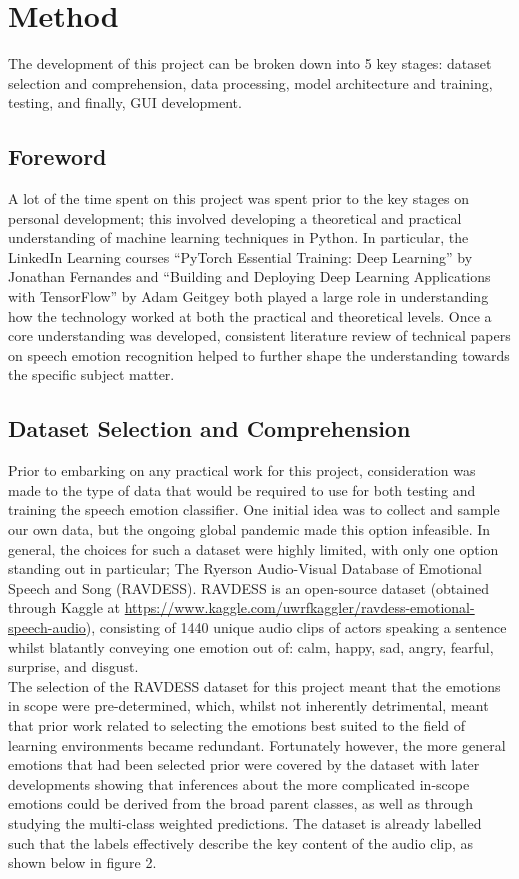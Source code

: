 \documentclass[12pt]{article}
\begin{document}
\section{Method}
The development of this project can be broken down into 5 key stages: dataset selection and comprehension, data processing, model architecture and training, testing, and finally, GUI development.
\subsection{Foreword}
A lot of the time spent on this project was spent prior to the key stages on personal development; this involved developing a theoretical and practical understanding of machine learning techniques in Python. In particular, the LinkedIn Learning courses ``PyTorch Essential Training: Deep Learning'' by Jonathan Fernandes and ``Building and Deploying Deep Learning Applications with TensorFlow'' by Adam Geitgey both played a large role in understanding how the technology worked at both the practical and theoretical levels. Once a core understanding was developed, consistent literature review of technical papers on speech emotion recognition helped to further shape the understanding towards the specific subject matter.
\subsection{Dataset Selection and Comprehension}
Prior to embarking on any practical work for this project, consideration was made to the type of data that would be required to use for both testing and training the speech emotion classifier. One initial idea was to collect and sample our own data, but the ongoing global pandemic made this option infeasible. In general, the choices for such a dataset were highly limited, with only one option standing out in particular; The Ryerson Audio-Visual Database of Emotional Speech and Song (RAVDESS). RAVDESS is an open-source dataset (obtained through Kaggle at \href{https://www.kaggle.com/uwrfkaggler/ravdess-emotional-speech-audio}{https://www.kaggle.com/uwrfkaggler/ravdess-emotional-speech-audio}), consisting of 1440 unique audio clips of actors speaking a sentence whilst blatantly conveying one emotion out of: calm, happy, sad, angry, fearful, surprise, and disgust.
\\

\noindent The selection of the RAVDESS dataset for this project meant that the emotions in scope were pre-determined, which, whilst not inherently detrimental, meant that prior work related to selecting the emotions best suited to the field of learning environments became redundant. Fortunately however, the more general emotions that had been selected prior were covered by the dataset with later developments showing that inferences about the more complicated in-scope emotions could be derived from the broad parent classes, as well as through studying the multi-class weighted predictions.
\newpage
\noindent The dataset is already labelled such that the labels effectively describe the key content of the audio clip, as shown below in figure 2.
\\
\end{document}
